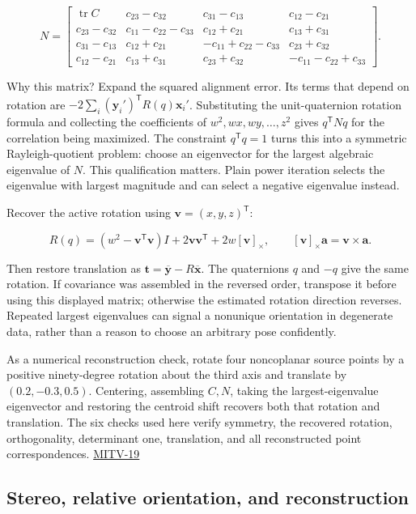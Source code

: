 \[
N=\begin{bmatrix}
\operatorname{tr}C&c_{23}-c_{32}&c_{31}-c_{13}&c_{12}-c_{21}\\
c_{23}-c_{32}&c_{11}-c_{22}-c_{33}&c_{12}+c_{21}&c_{13}+c_{31}\\
c_{31}-c_{13}&c_{12}+c_{21}&-c_{11}+c_{22}-c_{33}&c_{23}+c_{32}\\
c_{12}-c_{21}&c_{13}+c_{31}&c_{23}+c_{32}&-c_{11}-c_{22}+c_{33}
\end{bmatrix}.
\]

Why this matrix? Expand the squared alignment error. Its terms that depend on rotation are \(-2\sum_i(\mathbf y_i')^{\mathsf T}R(q)\mathbf x_i'\). Substituting the unit-quaternion rotation formula and collecting the coefficients of \(w^2,wx,wy,\ldots,z^2\) gives \(q^{\mathsf T}Nq\) for the correlation being maximized. The constraint \(q^{\mathsf T}q=1\) turns this into a symmetric Rayleigh-quotient problem: choose an eigenvector for the largest algebraic eigenvalue of \(N\). This qualification matters. Plain power iteration selects the eigenvalue with largest magnitude and can select a negative eigenvalue instead.

Recover the active rotation using \(\mathbf v=(x,y,z)^{\mathsf T}\):

\[
R(q)=(w^2-\mathbf v^{\mathsf T}\mathbf v)I+2\mathbf v\mathbf v^{\mathsf T}+2w[\mathbf v]_\times,
\qquad [\mathbf v]_\times\mathbf a=\mathbf v\times\mathbf a.
\]

Then restore translation as \(\mathbf t=\overline{\mathbf y}-R\overline{\mathbf x}\). The quaternions \(q\) and \(-q\) give the same rotation. If covariance was assembled in the reversed order, transpose it before using this displayed matrix; otherwise the estimated rotation direction reverses. Repeated largest eigenvalues can signal a nonunique orientation in degenerate data, rather than a reason to choose an arbitrary pose confidently.

As a numerical reconstruction check, rotate four noncoplanar source points by a positive ninety-degree rotation about the third axis and translate by \((0.2,-0.3,0.5)\). Centering, assembling \(C,N\), taking the largest-eigenvalue eigenvector and restoring the centroid shift recovers both that rotation and translation. The six checks used here verify symmetry, the recovered rotation, orthogonality, determinant one, translation, and all reconstructed point correspondences. \hyperref[04-visual-computing-ii-ch036]{MITV-19}

\subsection{Stereo, relative orientation, and reconstruction}\label{stereo-relative-orientation-and-reconstruction}

